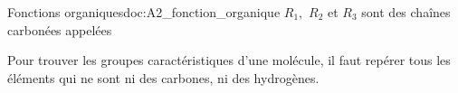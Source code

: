 \begin{doc}{Fonctions organiques}{doc:A2_fonction_organique}
  $R_1,$ $R_2$ et $R_3$ sont des chaînes carbonées appelées 

  \begin{importants}
    Pour trouver les groupes caractéristiques d'une molécule, il faut repérer tous les éléments qui ne sont ni des carbones, ni des hydrogènes.
  \end{importants}
\end{doc}